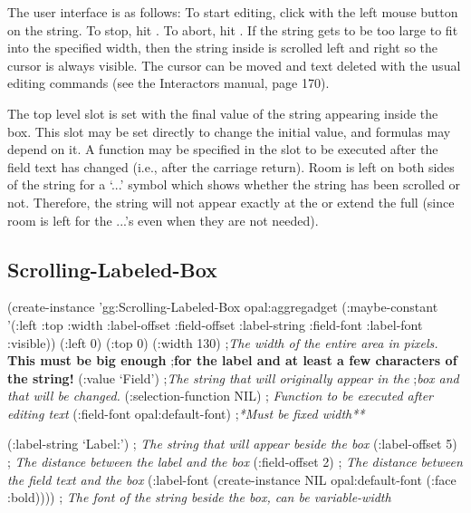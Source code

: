 The user interface is as follows: To start editing, click with the
left mouse button on the string.  To stop, hit .  To abort, hit
.  If the string gets to be too large to fit into the
specified width, then the string inside is scrolled left and right so
the cursor is always visible.  The cursor can be moved and text
deleted with the usual editing commands (see the Interactors manual,
page 170).

The top level  slot is set with the final value of the
string appearing inside the box.  This slot may be set directly to
change the initial value, and formulas may depend on it.  A function
may be specified in the  slot to be executed
after the field text has changed (i.e., after the carriage return).
Room is left on both sides of the string for a `...' symbol which
shows whether the string has been scrolled or not.  Therefore, the
string will not appear exactly at the  or extend the full
 (since room is left for the ...'s even when they are not
needed).

\begin{group}
\section{Scrolling-Labeled-Box}
\label{scrolling-labeled-box}

\begin{programexample}
(create-instance 'gg:Scrolling-Labeled-Box opal:aggregadget
   (:maybe-constant '(:left :top :width :label-offset :field-offset
		      :label-string :field-font :label-font :visible))
   (:left 0) (:top 0)
   (:width 130) ;{\it The width of the entire area in pixels.}  {\bf This must be big enough}
 	        ;{\bf for the label and at least a few characters of the string!}
   (:value `Field') ;{\it The string that will originally appear in the}
		    ;{\it   box and that will be changed.}
   (:selection-function NIL) ; {\it Function to be executed after editing text}
   (:field-font opal:default-font) ;{\it **Must be fixed width**}

   (:label-string `Label:') ; {\it The string that will appear beside the box}
   (:label-offset 5) ; {\it The distance between the label and the box}
   (:field-offset 2) ; {\it The distance between the field text and the box}
   (:label-font (create-instance NIL opal:default-font (:face :bold))))
		     ; {\it The font of the string beside the box, can be variable-width}
\end{programexample}
\end{group}

